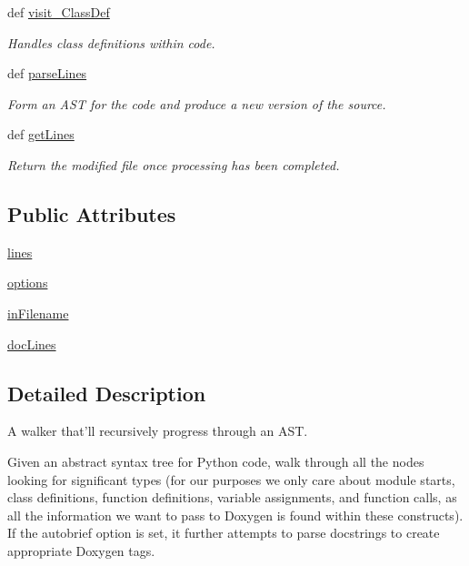 \begin{DoxyCompactItemize}
def \hyperlink{classdoxypypy_1_1doxypypy_1_1_ast_walker_a2001192ab8fd61eafac771db59102d15}{visit\-\_\-\-Class\-Def}
\begin{DoxyCompactList}\small\item\em Handles class definitions within code. \end{DoxyCompactList}\item 
def \hyperlink{classdoxypypy_1_1doxypypy_1_1_ast_walker_a32daaefd7456e4e9bbebcbfb93120ed4}{parse\-Lines}
\begin{DoxyCompactList}\small\item\em Form an A\-S\-T for the code and produce a new version of the source. \end{DoxyCompactList}\item 
def \hyperlink{classdoxypypy_1_1doxypypy_1_1_ast_walker_a3055ed0ac5063283e09c1d5eaee5a165}{get\-Lines}
\begin{DoxyCompactList}\small\item\em Return the modified file once processing has been completed. \end{DoxyCompactList}\end{DoxyCompactItemize}
\subsection*{Public Attributes}
\begin{DoxyCompactItemize}
\item 
\hyperlink{classdoxypypy_1_1doxypypy_1_1_ast_walker_ab77b4c94a443f0fbdf0fcd28f69ff8c4}{lines}
\item 
\hyperlink{classdoxypypy_1_1doxypypy_1_1_ast_walker_ae8bf6ec89e1a489b597f7955ba75cab3}{options}
\item 
\hyperlink{classdoxypypy_1_1doxypypy_1_1_ast_walker_ad509d320dcdb995e199dad9cf35957bb}{in\-Filename}
\item 
\hyperlink{classdoxypypy_1_1doxypypy_1_1_ast_walker_a3683c5fcc8b34d2c369ca2d06522e80b}{doc\-Lines}
\end{DoxyCompactItemize}


\subsection{Detailed Description}
A walker that'll recursively progress through an A\-S\-T. 

Given an abstract syntax tree for Python code, walk through all the nodes looking for significant types (for our purposes we only care about module starts, class definitions, function definitions, variable assignments, and function calls, as all the information we want to pass to Doxygen is found within these constructs). If the autobrief option is set, it further attempts to parse docstrings to create appropriate Doxygen tags. 

